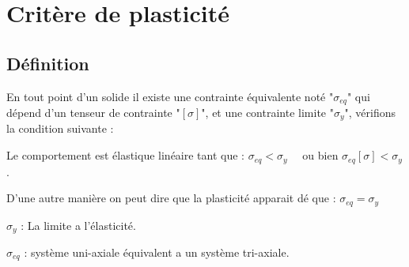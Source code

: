 \documentclass[12pt,a4paper]{report}
\begin{document}
	\begin{center}
		
	
	
	
	
	\end{center}
	
	
	
	\section{Critère de plasticité}
	
	\subsection{Définition}
	
	En tout point d'un solide il existe une contrainte équivalente noté "$\sigma_{eq}$" qui dépend d'un tenseur de contrainte "$ [\sigma] $", et une contrainte limite "$\sigma_{y}$", vérifions la condition suivante : 
	
	\vspace{\baselineskip}
	
	Le comportement est élastique linéaire tant que : $\sigma_{eq} < \sigma_{y} \quad$ ou bien $ \sigma_{eq}[\sigma] < \sigma_{y} $.
	
	\vspace{\baselineskip}
	
	D'une autre manière on peut dire que la plasticité apparait dé que : $\sigma_{eq} = \sigma_{y}$
	
	\vspace{\baselineskip}
	
	$\sigma_{y}$ : La limite a l'élasticité.
	
	$\sigma_{eq}$ : système uni-axiale équivalent a un système tri-axiale.
	
	\vspace{\baselineskip}
	
\end{document}
